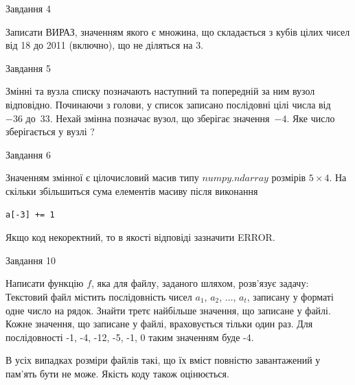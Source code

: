 \documentclass[12pt, ukrainian]{article}
\begin{document}
{\begin{minipage}[t]{8.0cm}
\end{minipage}


               
{\begin{center}Завдання {4}\end{center}}
\vspace{-4mm}
Записати ВИРАЗ, значенням якого є множина, що складається з кубів цілих чисел від 18 до 2011 (включно), що не діляться на 3.\par

\vspace{10mm}
               
{\begin{center}Завдання {5}\end{center}}
\vspace{-4mm}
Змінні  та  вузла списку позначають наступний та попередній за ним вузол відповідно. Починаючи з голови, у список записано послідовні цілі числа від~$-36$ до~$33$. Нехай змінна  позначає вузол, що зберігає значення~$-4$.
Яке число зберігається у вузлі  ?\par

               
{\begin{center}Завдання {6}\end{center}}
\vspace{-4mm}
Значенням змінної  є цілочисловий масив типу $numpy.ndarray$ розмірів $5{\times}4$. На скільки збільшиться сума елементів масиву  після виконання
\begin{verbatim}
a[-3] += 1
\end{verbatim}


Якщо код некоректний, то в якості відповіді зазначити ERROR.\par

               
{\begin{center}Завдання {10}\end{center}}
\vspace{-4mm}

Написати функцію $f$, яка для файлу, заданого шляхом, розв’язує задачу:\\ Текстовий файл містить послідовність чисел $a_1$, $a_2$, $\ldots$, $a_t$, записану у форматі одне число на рядок. Знайти третє найбільше значення, що записане у файлі. Кожне значення, що записане у файлі, враховується тільки один раз. Для послідовності -1, -4, -12, -5, -1, 0 таким значенням буде -4.

В усіх випадках розміри файлів такі, що їх вміст повністю завантажений у пам'ять бути не може. Якість коду також оцінюється.



}
\end{document}
